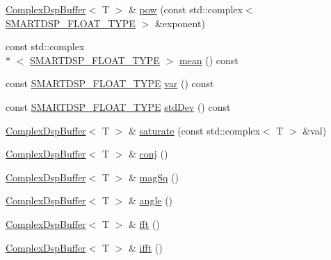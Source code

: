\begin{DoxyCompactItemize}
\hyperlink{class_smart_dsp_1_1_complex_dsp_buffer}{Complex\+Dsp\+Buffer}$<$ T $>$ \& \hyperlink{class_smart_dsp_1_1_complex_dsp_buffer_aec4366235f3edf309de92965935b78cd}{pow} (const std\+::complex$<$ \hyperlink{_dsp_buffer_8h_a9ed4123d332590f7a6161bc2061eac49}{S\+M\+A\+R\+T\+D\+S\+P\+\_\+\+F\+L\+O\+A\+T\+\_\+\+T\+Y\+P\+E} $>$ \&exponent)
\item 
const std\+::complex\\*
$<$ \hyperlink{_dsp_buffer_8h_a9ed4123d332590f7a6161bc2061eac49}{S\+M\+A\+R\+T\+D\+S\+P\+\_\+\+F\+L\+O\+A\+T\+\_\+\+T\+Y\+P\+E} $>$ \hyperlink{class_smart_dsp_1_1_complex_dsp_buffer_a7da9f78136a95bec50655db8691dfb0a}{mean} () const 
\item 
const \hyperlink{_dsp_buffer_8h_a9ed4123d332590f7a6161bc2061eac49}{S\+M\+A\+R\+T\+D\+S\+P\+\_\+\+F\+L\+O\+A\+T\+\_\+\+T\+Y\+P\+E} \hyperlink{class_smart_dsp_1_1_complex_dsp_buffer_af78c489f4a00ae0b8d5fa5d64feb7abc}{var} () const 
\item 
const \hyperlink{_dsp_buffer_8h_a9ed4123d332590f7a6161bc2061eac49}{S\+M\+A\+R\+T\+D\+S\+P\+\_\+\+F\+L\+O\+A\+T\+\_\+\+T\+Y\+P\+E} \hyperlink{class_smart_dsp_1_1_complex_dsp_buffer_a716333b41953cf8819d0eec56aa46586}{std\+Dev} () const 
\item 
\hyperlink{class_smart_dsp_1_1_complex_dsp_buffer}{Complex\+Dsp\+Buffer}$<$ T $>$ \& \hyperlink{class_smart_dsp_1_1_complex_dsp_buffer_afbef620dde7dad4d74bde4f5c1b9dea7}{saturate} (const std\+::complex$<$ T $>$ \&val)
\item 
\hyperlink{class_smart_dsp_1_1_complex_dsp_buffer}{Complex\+Dsp\+Buffer}$<$ T $>$ \& \hyperlink{class_smart_dsp_1_1_complex_dsp_buffer_a1e788380918a6f69d3b0108b86e674b7}{conj} ()
\item 
\hyperlink{class_smart_dsp_1_1_complex_dsp_buffer}{Complex\+Dsp\+Buffer}$<$ T $>$ \& \hyperlink{class_smart_dsp_1_1_complex_dsp_buffer_a47e61137f6dbce0f011ba646b573be7a}{mag\+Sq} ()
\item 
\hyperlink{class_smart_dsp_1_1_complex_dsp_buffer}{Complex\+Dsp\+Buffer}$<$ T $>$ \& \hyperlink{class_smart_dsp_1_1_complex_dsp_buffer_a0b113e3c71f99cdda46fb1d9f68cf7f4}{angle} ()
\item 
\hyperlink{class_smart_dsp_1_1_complex_dsp_buffer}{Complex\+Dsp\+Buffer}$<$ T $>$ \& \hyperlink{class_smart_dsp_1_1_complex_dsp_buffer_a17a6c426c513f4bb0a71ee537d7407a3}{fft} ()
\item 
\hyperlink{class_smart_dsp_1_1_complex_dsp_buffer}{Complex\+Dsp\+Buffer}$<$ T $>$ \& \hyperlink{class_smart_dsp_1_1_complex_dsp_buffer_a6eb8421aa0d6ace37d2966b2bce4af24}{ifft} ()
\end{DoxyCompactItemize}
